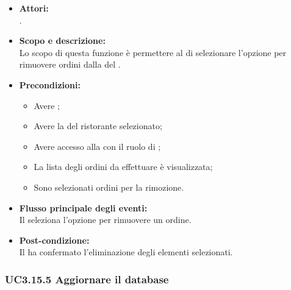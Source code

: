 \begin{itemize}
	\item \textbf{Attori:}
	\\.
	\item \textbf{Scopo e descrizione:} 
	\\Lo scopo di questa funzione è permettere al  di selezionare l'opzione per rimuovere ordini dalla  del .
	\item \textbf{Precondizioni:}
	\begin{itemize}
		\item Avere ;
		\item Avere la  del ristorante selezionato;
		\item Avere accesso alla  con il ruolo di ;
		\item La lista degli ordini da effettuare è visualizzata;
		\item Sono selezionati ordini per la rimozione.
	\end{itemize}
	\item \textbf{Flusso principale degli eventi:}
	\\Il {} seleziona l'opzione per rimuovere un ordine.
	\item \textbf{Post-condizione:}
	\\Il {} ha confermato l'eliminazione degli elementi selezionati.
\end{itemize}

\subsubsection{UC3.15.5 Aggiornare il database} \label{UC3.15.5}


